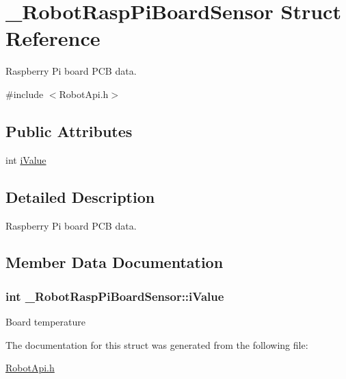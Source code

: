 \hypertarget{struct__RobotRaspPiBoardSensor}{\section{\-\_\-\-Robot\-Rasp\-Pi\-Board\-Sensor Struct Reference}
\label{struct__RobotRaspPiBoardSensor}
}


Raspberry Pi board P\-C\-B data.  




{\ttfamily \#include $<$Robot\-Api.\-h$>$}

\subsection*{Public Attributes}
\begin{DoxyCompactItemize}
\item 
int \hyperlink{struct__RobotRaspPiBoardSensor_a6121402932f93d71f7b1140d087079cf}{i\-Value}
\end{DoxyCompactItemize}


\subsection{Detailed Description}
Raspberry Pi board P\-C\-B data. 

\subsection{Member Data Documentation}
\hypertarget{struct__RobotRaspPiBoardSensor_a6121402932f93d71f7b1140d087079cf}{
\subsubsection[{i\-Value}]{\setlength{\rightskip}{0pt plus 5cm}int \-\_\-\-Robot\-Rasp\-Pi\-Board\-Sensor\-::i\-Value}}\label{struct__RobotRaspPiBoardSensor_a6121402932f93d71f7b1140d087079cf}
Board temperature 

The documentation for this struct was generated from the following file\-:\begin{DoxyCompactItemize}
\item 
\hyperlink{RobotApi_8h}{Robot\-Api.\-h}\end{DoxyCompactItemize}
